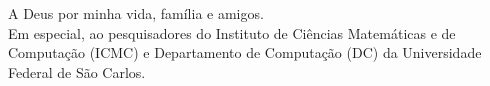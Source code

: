 A Deus por minha vida, família e amigos. \\
Em especial, ao pesquisadores do Instituto de Ciências Matemáticas e de Computação (ICMC) e Departamento de Computação (DC) da Universidade Federal de São Carlos.
